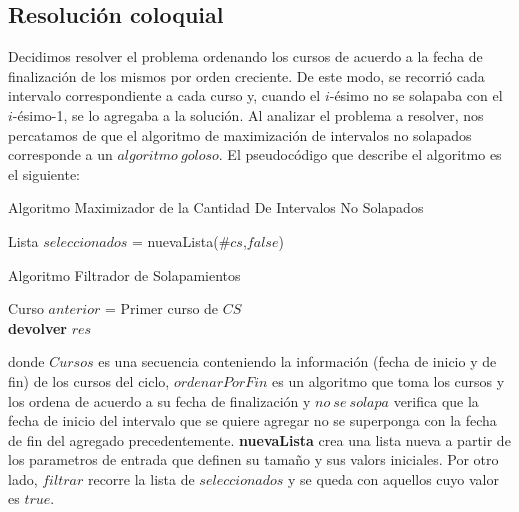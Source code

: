 \subsection{Resolución coloquial}

Decidimos resolver el problema ordenando los cursos de acuerdo a la fecha de finalización de los mismos por orden creciente. De este modo, se recorrió cada intervalo correspondiente a cada curso y, cuando el $i$-ésimo no se solapaba con el $i$-ésimo-1, se lo agregaba a la solución.\newline
Al analizar el problema a resolver, nos percatamos de que el algoritmo de maximización de intervalos no solapados corresponde a un $algoritmo\ goloso$. El pseudocódigo que describe el algoritmo es el siguiente:\newline

\begin{algorithm}[H]
    \SetAlgoLined
    \caption{Algoritmo Maximizador de la Cantidad De Intervalos No Solapados}
    Lista $seleccionados$ = nuevaLista($\#cs$,$false$)\\
\end{algorithm}

\begin{algorithm}[H]
    \SetAlgoLined
    \caption{Algoritmo Filtrador de Solapamientos}
    Curso $anterior$ = Primer curso de $CS$\\
    \textbf{devolver} $res$\\   
\end{algorithm}


donde $Cursos$ es una secuencia conteniendo la información (fecha de inicio y de fin) de los cursos del ciclo, $ordenarPorFin$ es un algoritmo que toma los cursos y los ordena de acuerdo a su fecha de finalización y $no\ se\ solapa$ verifica que la fecha de inicio del intervalo que se quiere agregar no se superponga con la fecha de fin del agregado precedentemente. \textbf{nuevaLista} crea una lista nueva a partir de los parametros de entrada que definen su tamaño y sus valors iniciales. Por otro lado, $filtrar$ recorre la lista de $seleccionados$ y se queda con aquellos cuyo valor es $true$.

